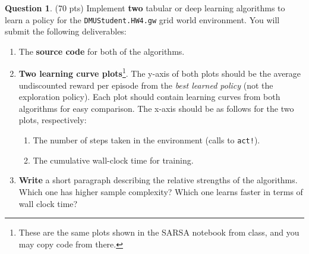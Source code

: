 \documentclass{article}
\theoremstyle{definition}
\newtheorem{question}[thm]{Question}
\begin{document}
\begin{question}
    (70 pts) Implement \textbf{two} tabular or deep learning algorithms to learn a policy for the \texttt{DMUStudent.HW4.gw} grid world environment.     You will submit the following deliverables:

    \begin{enumerate}[label=\alph*)]
        \item The \textbf{source code} for both of the algorithms.
        \item \textbf{Two learning curve plots}\footnote{These are the same plots shown in the SARSA notebook from class, and you may copy code from there.}.  The y-axis of both plots should be the average undiscounted reward per episode from the \emph{best learned policy} (not the exploration policy). Each plot should contain learning curves from both algorithms for easy comparison. The x-axis should be as follows for the two plots, respectively:
            \begin{enumerate}[label=\arabic*)]
                \item The number of steps taken in the environment (calls to \texttt{act!}).
                \item The cumulative wall-clock time for training.
            \end{enumerate}
        \item \textbf{Write} a short paragraph describing the relative strengths of the algorithms. Which one has higher sample complexity? Which one learns faster in terms of wall clock time?
    \end{enumerate}
\end{question}
\end{document}
